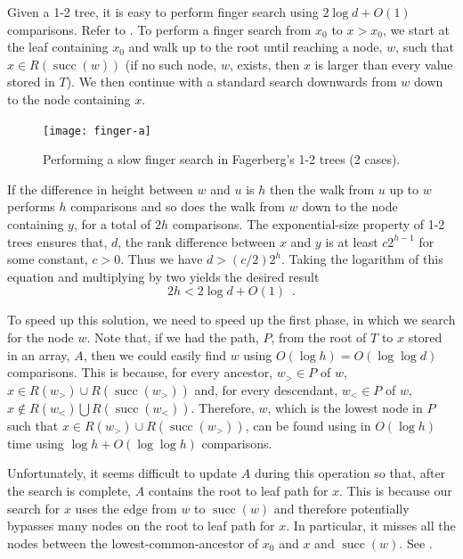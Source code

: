 \documentclass{patmorin}
\DeclareMathOperator{\scc}{succ}
\begin{document}
Given a 1-2 tree, it is easy to perform finger search using $2\log d +
O(1)$ comparisons.  Refer to . To perform a finger search
from $x_0$ to $x>x_0$, we start at the leaf containing $x_0$ and walk
up to the root until reaching a node, $w$, such that $x\in R(\scc(w))$
(if no such node, $w$, exists, then $x$ is larger than every value stored
in $T$).  We then continue with a standard search downwards from $w$
down to the node containing $x$.

\begin{figure}
  \begin{center}
    \texttt{[image: finger-a]}
  \end{center}
  \caption{Performing a slow finger search in Fagerberg's 1-2 trees (2 cases).}
\end{figure}

If the difference in height between $w$ and $u$ is $h$ then the walk
from $u$ up to $w$ performs $h$ comparisons and so does the walk from
$w$ down to the node containing $y$, for a total of $2h$ comparisons.
The exponential-size property of 1-2 trees ensures that, $d$, the rank
difference between $x$ and $y$ is at least $c2^{h-1}$ for some constant,
$c>0$.  Thus we have $d > (c/2)2^h$. Taking the logarithm of this equation
and multiplying by two yields the desired result
\[
  2h < 2\log d + O(1) \enspace .
\]

To speed up this solution, we need to speed up the first phase, in which
we search for the node $w$.  Note that, if we had the path, $P$, from
the root of $T$ to $x$ stored in an array, $A$, then we could easily
find $w$ using $O(\log h)=O(\log\log d)$ comparisons.  This is because,
for every ancestor, $w_>\in P$ of $w$, $x\in R(w_>)\cup R(\scc(w_>))$
and, for every descendant, $w_<\in P$ of $w$, $x\not\in R(w_<)\bigcup
R(\scc(w_<))$.  Therefore, $w$, which is the lowest node in $P$ such that
$x\in R(w_>)\cup R(\scc(w_>))$, can be found using 
in $O(\log h)$ time using $\log h+O(\log\log h)$ comparisons. 

Unfortunately, it seems difficult to update $A$ during this operation
so that, after the search is complete, $A$ contains the root to leaf
path for $x$.  This is because our search for $x$ uses the edge from
$w$ to $\scc(w)$ and therefore potentially bypasses many nodes on the
root to leaf path for $x$.  In particular, it misses all the nodes
between the lowest-common-ancestor of $x_0$ and $x$ and $\scc(w)$.
See .
\end{document}
